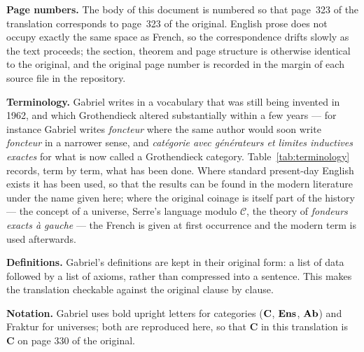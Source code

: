 \medskip
\noindent\textbf{Page numbers.}
The body of this document is numbered so that page~323 of the translation
corresponds to page~323 of the original. English prose does not occupy
exactly the same space as French, so the correspondence drifts slowly as the
text proceeds; the section, theorem and page structure is otherwise identical
to the original, and the original page number is recorded in the margin of
each source file in the repository.

\medskip
\noindent\textbf{Terminology.}
Gabriel writes in a vocabulary that was still being invented in 1962, and
which Grothendieck altered substantially within a few years --- for instance
Gabriel writes \emph{foncteur} where the same author would soon write
\emph{foncteur} in a narrower sense, and \emph{catégorie avec générateurs et
limites inductives exactes} for what is now called a Grothendieck category.
Table~\ref{tab:terminology} records, term by term, what has been done. Where
standard present-day English exists it has been used, so that the results can
be found in the modern literature under the name given here; where the
original coinage is itself part of the history --- the concept of a universe,
Serre's language modulo $\mathcal{C}$, the theory of \emph{fondeurs exacts à
gauche} --- the French is given at first occurrence and the modern term is
used afterwards.

\medskip
\noindent\textbf{Definitions.}
Gabriel's definitions are kept in their original form: a list of data followed
by a list of axioms, rather than compressed into a sentence. This makes the
translation checkable against the original clause by clause.

\medskip
\noindent\textbf{Notation.}
Gabriel uses bold upright letters for categories ($\mathbf{C}$, $\mathbf{Ens}$, $\mathbf{Ab}$) and
Fraktur for universes; both are reproduced here, so that $\mathbf{C}$ in this
translation is $\mathbf{C}$ on page 330 of the original.

\tableofcontents

